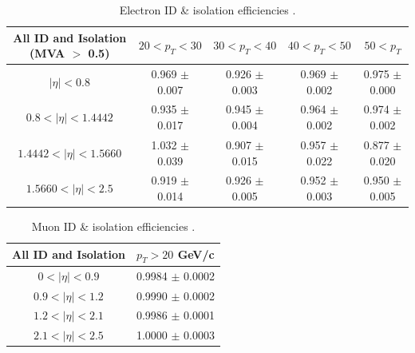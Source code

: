 \documentclass[oneside, a4paper, 11pt, ]{report}
\begin{document}
\begin{table} \label{tab-ElectronEfficiencies}
\begin{center}
\begin{tabular}{|c|c|c|c|c|}
\hline
	\textbf{All ID and Isolation (MVA $>$ 0.5)} & $20 < p_T < 30$ & $30 < p_T < 40$ & $40 < p_T < 50$ & $50 < p_T$ \\
\hline	
	$|\eta| < 0.8$ & 0.969 $\pm$ 0.007 & 0.926 $\pm$ 0.003 & 0.969 $\pm$ 0.002 & 0.975 $\pm$ 0.000 \\
	$0.8 < |\eta| < 1.4442$ & 0.935 $\pm$ 0.017 & 0.945 $\pm$ 0.004 & 0.964 $\pm$ 0.002 & 0.974 $\pm$ 0.002 \\
	$1.4442 < |\eta| < 1.5660$ & 1.032 $\pm$ 0.039 & 0.907 $\pm$ 0.015 & 0.957 $\pm$ 0.022 & 0.877 $\pm$ 0.020 \\
	$1.5660 < |\eta| < 2.5$ & 0.919 $\pm$ 0.014 & 0.926 $\pm$ 0.005 & 0.952 $\pm$ 0.003 & 0.950 $\pm$ 0.005 \\
\hline	
\end{tabular}
\caption{Electron ID \& isolation efficiencies \cite{ElectronEfficiencies}.}
\end{center}
\end{table}

\begin{table} \label{tab-MuonEfficiencies}
\begin{center}
\begin{tabular}{|c|c|}
\hline
	\textbf{All ID and Isolation} & $p_T > 20$ GeV/c \\
\hline	
	$0 < |\eta| < 0.9$ & 0.9984 $\pm$ 0.0002 \\
	$0.9 < |\eta| < 1.2$ & 0.9990 $\pm$ 0.0002 \\
	$1.2 < |\eta| < 2.1$ & 0.9986 $\pm$ 0.0001 \\
	$2.1 < |\eta| < 2.5$ & 1.0000 $\pm$ 0.0003 \\
\hline	
\end{tabular}
\caption{Muon ID \& isolation efficiencies \cite{MuonEfficiencies}.}
\end{center}
\end{table}



\end{document}
